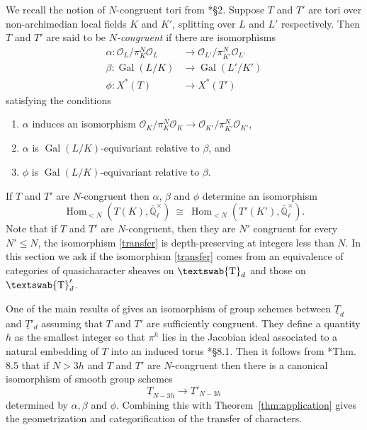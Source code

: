 \documentclass[11pt]{amsart}
\newcommand{\mathswab}[1]{\operatorname{\textswab{#1}}}
\theoremstyle{plain}
\theoremstyle{definition}
\theoremstyle{remark}
\newcommand{\EE}{\mathbb{\bar Q}_\ell}
\newcommand{\OK}{\mathcal{O}_K}
\newcommand{\OL}{\mathcal{O}_L}
\newcommand{\OO}[1]{\mathcal{O}_{#1}}
\newcommand{\EEx}{\EE^\times}
\DeclareMathOperator{\Gal}{Gal}
\DeclareMathOperator{\Hom}{Hom}
\newcommand{\iso}{{\ \cong\ }}
\newcommand{\GN}[1]{\mathswab{#1}}
\newcommand{\TT}{\underline{T}}
\begin{document}
We recall the notion of $N$-congruent tori from  \cite{chai-yu:01a}*{\S 2}.
Suppose $T$ and $T'$ are tori over non-archimedian local fields $K$ and $K'$,
splitting over $L$ and $L'$ respectively.
Then $T$ and $T'$ are said to be \emph{$N$-congruent} if there are isomorphisms
 \begin{align*}
  \alpha : \OL/\pi_K^N \OL &\to \OO{L'}/\pi_{K'}^N \OO{L'} \\
  \beta : \Gal(L/K) &\to \Gal(L'/K') \\
  \phi : X^*(T) &\to X^*(T')
 \end{align*}
 satisfying the conditions
 \begin{enumerate}
  \item $\alpha$ induces an isomorphism $\OK/\pi_K^N \OK \to \OO{K'}/\pi_{K'}^N \OO{K'}$,
  \item $\alpha$ is $\Gal(L/K)$-equivariant relative to $\beta$, and
  \item $\phi$ is $\Gal(L/K)$-equivariant relative to $\beta$.
 \end{enumerate}
If $T$ and $T'$ are $N$-congruent then $\alpha$, $\beta$ and $\phi$ determine an isomorphism
\begin{equation}\label{transfer}
  \Hom_{<N}(T(K), \EEx) \iso \Hom_{<N}(T'(K'),\EEx).
\end{equation}
Note that if $T$ and $T'$ are $N$-congruent, then they are $N'$ congruent for every
$N' \leq N$, the isomorphism \eqref{transfer} is depth-preserving at integers less than $N$.
In this section we ask if the isomorphism \eqref{transfer} comes from an equivalence of
categories of quasicharacter sheaves on $\GN{T}_d$ and those on $\GN{T}'_d$.

One of the main results of \cite{chai-yu:01a} gives an isomorphism of group schemes between
$\TT_d$ and $\TT'_d$ assuming that $T$ and $T'$ are sufficiently congruent.
They define a quantity $h$ as the smallest integer so that $\pi^h$ lies in the
Jacobian ideal associated to a natural embedding of $T$ into an induced torus \cite{chai-yu:01a}*{\S 8.1}.
Then it follows from \cite{chai-yu:01a}*{Thm. 8.5} that if $N > 3h$ and $T$ and $T'$ are $N$-congruent 
then there is a canonical isomorphism of smooth group schemes
 \[
  \TT_{N-3h} \to \TT'_{N-3h}
 \]
 determined by $\alpha, \beta$ and $\phi$.
Combining this with Theorem~\ref{thm:application} gives the geometrization and categorification of the transfer of characters.
\end{document}
